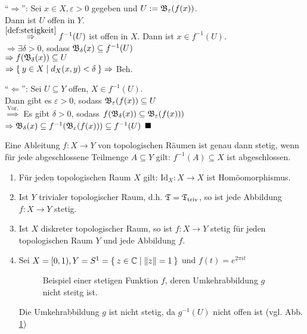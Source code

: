 \begin{beweis}
    \enquote{$\Rightarrow$}: Sei $x \in X, \varepsilon > 0$ gegeben
    und $U := \mathfrak{B}_\varepsilon(f(x))$.\\
    Dann ist $U$ offen in $Y$.\\
    $\stackrel{\ref{def:stetigkeit}}{\Rightarrow} f^{-1}(U)$  ist 
    offen in $X$. Dann ist $x \in f^{-1}(U)$.\\
    $\Rightarrow \exists \delta > 0$, sodass 
    $\mathfrak{B}_\delta(x) \subseteq f^{-1} (U)$\\
    $\Rightarrow f(\mathfrak{B}_\delta(x)) \subseteq U$\\
    $\Rightarrow \Set{y \in X | d_X(x,y) < \delta} \Rightarrow$ Beh.

    \enquote{$\Leftarrow$}: Sei $U \subseteq Y$ offen, $X \in f^{-1}(U)$.\\
    Dann gibt es $\varepsilon > 0$, sodass $\mathfrak{B}_\varepsilon(f(x)) \subseteq U$\\
    $\stackrel{\text{Vor.}}{\Rightarrow}$ Es gibt $\delta > 0$, sodass
    $f(\mathfrak{B}_\delta(x)) \subseteq \mathfrak{B}_\varepsilon (f(x)))$\\
    $\Rightarrow \mathfrak{B}_\delta(x) \subseteq f^{-1}(\mathfrak{B}_\varepsilon(f(x))) \subseteq f^{-1}(U)$
    $\qed$
\end{beweis}

\begin{bemerkung}
    Eine Ableitung $f: X \rightarrow Y$ von topologischen Räumen ist
    genau dann stetig, wenn für jede abgeschlossene Teilmenge $A \subseteq Y$
    gilt: $f^{-1}(A) \subseteq X$ ist abgeschlossen.
\end{bemerkung}

\begin{beispiel}
    \begin{enumerate}[label=\arabic*)]
        \item Für jeden topologischen Raum $X$ gilt: $\text{Id}_X : X \rightarrow X$
              ist Homöomorphismus.
        \item Ist $Y$ trivialer topologischer Raum, d.h. $\mathfrak{T} = \mathfrak{T}_\text{triv}$,
              so ist jede Abbildung $f:X \rightarrow Y$ stetig.
        \item Ist $X$ diskreter topologischer Raum, so ist $f:X \rightarrow Y$
              stetig für jeden topologischen Raum $Y$ und jede Abbildung $f$.
        \item Sei $X = [0, 1), Y = S^1 = \Set{z \in \ensuremath{\mathbb{C}}| \|z\| = 1}$
              und $f(t) = e^{2 \pi i t}$
              \begin{figure}
                \centering
                
                \caption{Beispiel einer stetigen Funktion $f$, deren 
                         Umkehrabbildung $g$ nicht steitg ist.}
                \label{fig:nicht-stetige-umkehrabbildung}
              \end{figure}
              Die Umkehrabbildung $g$ ist nicht stetig, da $g^{-1}(U)$
              nicht offen ist (vgl. Abb. \ref{fig:nicht-stetige-umkehrabbildung})
    \end{enumerate}
\end{beispiel}

